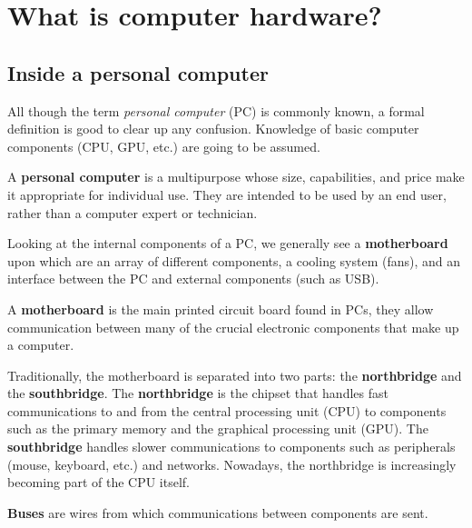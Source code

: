 \chapter{What is computer hardware?}

\section{Inside a personal computer}

All though the term \emph{personal computer} (PC) is commonly known, a formal definition is good to clear up any confusion. Knowledge of basic computer components (CPU, GPU, etc.) are going to be assumed.

\begin{definition}
    A \textbf{personal computer} is a multipurpose whose size, capabilities, and price make it appropriate for individual use. They are intended to be used by an end user, rather than a computer expert or technician.
\end{definition}

Looking at the internal components of a PC, we generally see a \textbf{motherboard} upon which are an array of different components, a cooling system (fans), and an interface between the PC and external components (such as USB).

\begin{definition}[Motherboard]
    A \textbf{motherboard} is the main printed circuit board found in PCs, they allow communication between many of the crucial electronic components that make up a computer.

\end{definition}

\begin{remark}
    Traditionally, the motherboard is separated into two parts: the \textbf{northbridge} and the \textbf{southbridge}. The \textbf{northbridge} is the chipset that handles fast communications to and from the central processing unit (CPU) to components such as the primary memory and the graphical processing unit (GPU). The \textbf{southbridge} handles slower communications to components such as peripherals (mouse, keyboard, etc.) and networks. Nowadays, the northbridge is increasingly becoming part of the CPU itself.
\end{remark}

\begin{definition}[Bus]
    \textbf{Buses} are wires from which communications between components are sent.
\end{definition}
 
